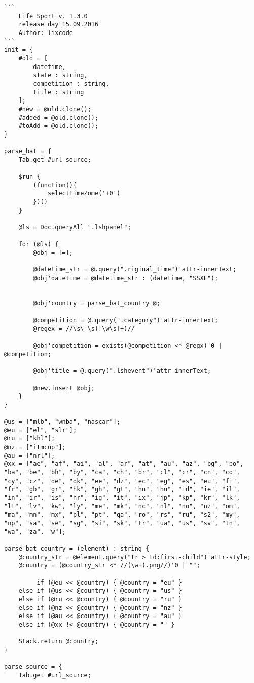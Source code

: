 \begin{lstlisting}
```
	Life Sport v. 1.3.0
	release day 15.09.2016
	Author: lixcode
```
init = {
	#old = [
		datetime, 
		state : string, 
		competition : string, 
		title : string
	];
	#new = @old.clone();
	#added = @old.clone();
	#toAdd = @old.clone();
}

parse_bat = {
	Tab.get #url_source;

	$run {
		(function(){
			selectTimeZome('+0')
		})()
	}

	@ls = Doc.queryAll ".lshpanel";

	for (@ls) {
		@obj = [=];

		@datetime_str = @.query(".riginal_time")'attr-innerText;
		@obj'datetime = @datetime_str : (datetime, "SSXE");

		
		@obj'country = parse_bat_country @;

		@competition = @.query(".category")'attr-innerText;
		@regex = //\s\-\s([\w\s]+)//
		
		@obj'competition = exists(@competition <* @regx)'0 | @competition;

		@obj'title = @.query(".lshevent")'attr-innerText;

		@new.insert @obj;
	}
}

@us = ["mlb", "wnba", "nascar"];
@eu = ["el", "slr"];
@ru = ["khl"];
@nz = ["itmcup"];
@au = ["nrl"];
@xx = ["ae", "af", "ai", "al", "ar", "at", "au", "az", "bg", "bo", "ba", "be", "bh", "by", "ca", "ch", "br", "cl", "cr", "cn", "co", "cy", "cz", "de", "dk", "ee", "dz", "ec", "eg", "es", "eu", "fi", "fr", "gb", "gr", "hk", "gh", "gt", "hn", "hu", "id", "ie", "il", "in", "ir", "is", "hr", "ig", "it", "ix", "jp", "kp", "kr", "lk", "lt", "lv", "kw", "ly", "me", "mk", "nc", "nl", "no", "nz", "om", "ma", "mn", "mx", "pl", "pt", "qa", "ro", "rs", "ru", "s2", "my", "np", "sa", "se", "sg", "si", "sk", "tr", "ua", "us", "sv", "tn", "wa", "za", "w"];

parse_bat_country = (element) : string {
	@country_str = @element.query("tr > td:first-child")'attr-style;
	@country = (@country_str <* //(\w+).png//)'0 | "";

	     if (@eu << @country) { @country = "eu" }
	else if (@us << @country) { @country = "us" }
	else if (@ru << @country) { @country = "ru" }
	else if (@nz << @country) { @country = "nz" }
	else if (@au << @country) { @country = "au" }
	else if (@xx !< @country) { @country = "" }

	Stack.return @country;
}

parse_source = {
	Tab.get #url_source;


\end{lstlisting}
